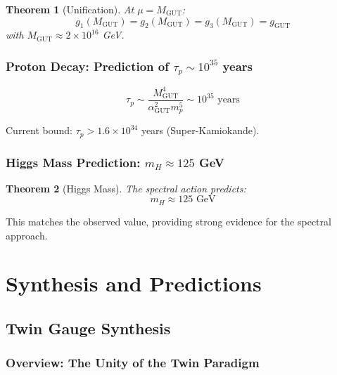 \documentclass[11pt,a4paper,openright]{book}
\theoremstyle{plain}
\newtheorem{theorem}{Theorem}[chapter]
\theoremstyle{definition}
\newcommand{\GUT}{\mathrm{GUT}}
\newcommand{\MGUT}{M_{\mathrm{GUT}}}
\begin{document}
\begin{theorem}[Unification]
At $\mu = \MGUT$:
\begin{equation}
g_1(\MGUT) = g_2(\MGUT) = g_3(\MGUT) = g_{\GUT}
\end{equation}
with $\MGUT \approx 2 \times 10^{16}$ GeV.
\end{theorem}

\section{Proton Decay: Prediction of $\tau_p \sim 10^{35}$ years}

\begin{mainresult}
\begin{equation}
\boxed{\tau_p \sim \frac{\MGUT^4}{\alpha_{\GUT}^2 m_p^5} \sim 10^{35} \text{ years}}
\end{equation}
\end{mainresult}

Current bound: $\tau_p > 1.6 \times 10^{34}$ years (Super-Kamiokande).

\section{Higgs Mass Prediction: $m_H \approx 125$ GeV}

\begin{theorem}[Higgs Mass]
The spectral action predicts:
\begin{equation}
m_H \approx 125 \text{ GeV}
\end{equation}
\end{theorem}

This matches the observed value, providing strong evidence for the spectral approach.

\part{Synthesis and Predictions}

\chapter{Twin Gauge Synthesis}
\label{ch:synthesis}

\section{Overview: The Unity of the Twin Paradigm}
\end{document}

